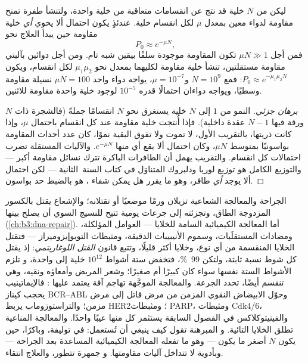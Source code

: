 \begin{theorem}\label{thm:b3:cancer-biology:goldie-coldman}
ليكن  من $N$ خلية قد نتج عن انقسامات متعاقبة
من خلية واحدة، ولتنشأ طفرة تمنح مقاومة لدواء معين
بمعدل $\mu$ لكل انقسام خلية. عندئذٍ يكون احتمال ألا يحوي
 \emph{أي} خلية مقاومة حين يبدأ العلاج نحو
\[
P_{0} \approx e^{-\mu N},
\]
فمن أجل $\mu N \gg 1$ تكون المقاومة موجودة سلفًا بيقين شبه تام.
ومن أجل دوائين بآليتي مقاومة مستقلتين، تنشأ خلية مقاومة
لكليهما بمعدل نحو $\mu_{1}\mu_{2}$ لكل انقسام، ويكون $P_{0}
\approx e^{-\mu_{1}\mu_{2}N}$: فمع $N = 10^{9}$ و$\mu = 10^{-7}$،
يواجه دواء واحد $\mu N = 100$ نسيلة مقاومة وسطيًا، ويواجه دواءان
احتمالًا قدره $10^{-5}$ لوجود خلية واحدة مقاومة للاثنين.
\end{theorem}
\begin{proof}[برهان جزئي]
النمو من $1$ إلى $N$ خلية يستغرق نحو $N$ انقسامًا جملةً (فالشجرة
ذات $N$ ورقة فيها $N - 1$ عقدة داخلية). فإذا أُنتجت خلية مقاومة
عند كل انقسام باحتمال $\mu$، وإذا كانت ذريتها، بالتقريب
الأول، لا تموت ولا تفوق البقية نموًا، كان
عدد أحداث المقاومة بواسونيًا بمتوسط $\mu N$، وكان
احتمال ألا يقع أي منها $e^{-\mu N}$. والآليات المستقلة تضرب
احتمالات كل انقسام. والتقريب يهمل أن الطافرات الباكرة
تترك نسائل مقاومة أكبر --- والتوزيع الكامل هو توزيع
لوريا ودلبروك المتناوَل في كتاب السنة~الثانية --- لكن
احتمال ألا يوجد \emph{أي} طافر، وهو ما يقرر هل يمكن شفاء
، هو بالضبط حد بواسون.
\end{proof}

\begin{example}\label{ex:b3:cancer-biology:therapy}
الجراحة والمعالجة الشعاعية تزيلان ورمًا موضعيًا أو تقتلانه؛ والإشعاع
يقتل بالكسور المزدوجة الطاق، وتجزئته إلى جرعات يومية
تتيح للنسيج السوي أن يصلح بينها (\cref{ch:b3:dna-repair}).
أما المعالجة الكيميائية السامة للخلايا --- العوامل المؤلكلة، ومضادات المستقلَبات،
وسموم الأنيبيبات الدقيقة، ومثبطات التوبوإيزوميراز --- فتقتل الخلايا المنقسمة
من أي نوع، وخلايا  أكثر قليلًا، وتتبع
قانون \emph{القتل اللوغاريتمي}: إذ يقتل كل شوط نسبة ثابتة، ولتكن
\qty{99}{\%}، فتخفض ستة أشواط $10^{12}$ خلية إلى واحدة، و
تلزم الأشواط الستة نفسها سواء كان  كبيرًا أم صغيرًا؛
وشعر المريض وأمعاؤه ونقيه، وهي تنقسم أيضًا، تحدد الجرعة.
والمعالجة الموجَّهة تهاجم آفة يعتمد عليها : فالإيماتينيب
يحجب كيناز BCR--ABL وحوّل الابيضاض النقوي المزمن من
مرض قاتل إلى مرض مزمن؛ والتراستوزوماب يربط HER2؛ ومثبطات
PARP، ومثبطات Cdk4/6، والفينيتوكلاكس في الفصول السابقة
يستثمر كل منها عيبًا واحدًا. والمعالجة المناعية تطلق الخلايا التائية. و
المبرهنة تقول كيف ينبغي أن تُستعمل: في توليفة، وباكرًا، حين يكون $N$
أصغر ما يكون --- وهو ما تفعله المعالجة الكيميائية المساعدة بعد الجراحة
--- وبأدوية لا تتداخل آليات مقاومتها. و
 جمهرة تتطور، والعلاج انتقاء.
\end{example}

